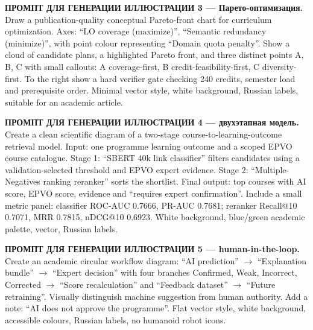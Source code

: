 \documentclass[twoside,11pt]{article}
\begin{document}
\medskip
\noindent\colorbox{yellow!25}{\parbox{0.96\linewidth}{
\textbf{ПРОМПТ ДЛЯ ГЕНЕРАЦИИ ИЛЛЮСТРАЦИИ 3 --- Парето-оптимизация.}\\
Draw a publication-quality conceptual Pareto-front chart for curriculum
optimization. Axes: ``LO coverage (maximize)'', ``Semantic redundancy
(minimize)'', with point colour representing ``Domain quota penalty''. Show a
cloud of candidate plans, a highlighted Pareto front, and three distinct points
A, B, C with small callouts: A coverage-first, B credit-feasibility-first,
C diversity-first. To the right show a hard verifier gate checking 240 credits,
semester load and prerequisite order. Minimal vector style, white background,
Russian labels, suitable for an academic article.
}}

\medskip
\noindent\colorbox{yellow!25}{\parbox{0.96\linewidth}{
\textbf{ПРОМПТ ДЛЯ ГЕНЕРАЦИИ ИЛЛЮСТРАЦИИ 4 --- двухэтапная модель.}\\
Create a clean scientific diagram of a two-stage course-to-learning-outcome
retrieval model. Input: one programme learning outcome and a scoped EPVO course
catalogue. Stage 1: ``SBERT 40k link classifier'' filters candidates using a
validation-selected threshold and EPVO expert evidence. Stage 2:
``Multiple-Negatives ranking reranker'' sorts the shortlist. Final output:
top courses with AI score, EPVO score, evidence and ``requires expert
confirmation''. Include a small metric panel: classifier ROC-AUC 0.7666,
PR-AUC 0.7681; reranker Recall@10 0.7071, MRR 0.7815, nDCG@10 0.6923.
White background, blue/green academic palette, vector, Russian labels.
}}

\medskip
\noindent\colorbox{yellow!25}{\parbox{0.96\linewidth}{
\textbf{ПРОМПТ ДЛЯ ГЕНЕРАЦИИ ИЛЛЮСТРАЦИИ 5 --- human-in-the-loop.}\\
Create an academic circular workflow diagram: ``AI prediction'' $\rightarrow$
``Explanation bundle'' $\rightarrow$ ``Expert decision'' with four branches
Confirmed, Weak, Incorrect, Corrected $\rightarrow$ ``Score recalculation'' and
``Feedback dataset'' $\rightarrow$ ``Future retraining''. Visually distinguish
machine suggestion from human authority. Add a note: ``AI does not approve the
programme''. Flat vector style, white background, accessible colours, Russian
labels, no humanoid robot icons.
}}
\end{document}
